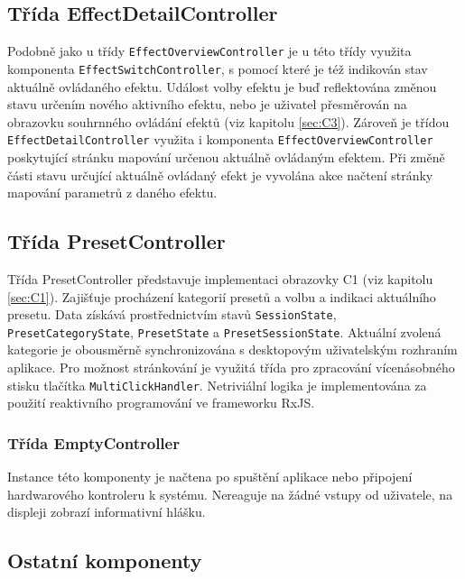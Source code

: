 \documentclass[thesis=M,czech]{FITthesis}[2019/03/06]
\begin{document}
			\subsection{Třída EffectDetailController}
				Podobně jako u třídy \texttt{EffectOverviewController} je u této třídy využita komponenta \texttt{EffectSwitchController},
				s pomocí které je též indikován stav aktuálně ovládaného efektu. Událost volby efektu je buď 
				reflektována změnou stavu určením nového aktivního efektu, nebo je uživatel přesměrován na obrazovku souhrnného ovládání efektů (viz kapitolu \ref{sec:C3}).
				Zároveň je třídou \texttt{EffectDetailController} využita i komponenta \texttt{EffectOverviewController} poskytující
				stránku mapování určenou aktuálně ovládaným efektem. Při změně části stavu určující aktuálně ovládaný efekt
				je vyvolána akce načtení stránky mapování parametrů z daného efektu.
		
			\subsection{Třída PresetController}
				Třída PresetController představuje implementaci obrazovky C1 (viz kapitolu \ref{sec:C1}). 
				Zajišťuje procházení kategorií presetů a volbu a indikaci aktuálního presetu.
				Data získává prostřednictvím stavů \texttt{SessionState}, \texttt{PresetCategoryState}, \texttt{PresetState} a \texttt{PresetSessionState}.
				Aktuální zvolená kategorie je obousměrně synchronizována s desktopovým uživatelským rozhraním aplikace.
				Pro možnost stránkování je využitá třída pro zpracování vícenásobného stisku tlačítka \texttt{MultiClickHandler}.
				Netriviální logika je implementována za použití reaktivního programování ve frameworku RxJS.
		
			\subsubsection{Třída EmptyController}
				Instance této komponenty je načtena po spuštění aplikace nebo připojení hardwarového kontroleru k systému. Nereaguje na žádné vstupy od uživatele, na displeji zobrazí informativní hlášku.
						
		
		\subsection{Ostatní komponenty}
\end{document}
